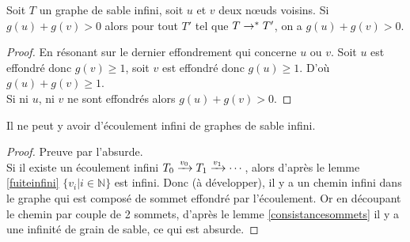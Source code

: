 \begin{lem}
\label{consistancesommets}
Soit $T$ un graphe de sable infini, soit $u$ et $v$ deux nœuds voisins. Si $g(u)+g(v)>0$ alors pour tout $T'$ tel que $T\rightarrow^* T'$, on a $g(u)+g(v)>0$.
\end{lem}
\begin{proof}
En résonant sur le dernier effondrement qui concerne $u$ ou $v$.
Soit $u$ est effondré donc $g(v)\geq 1$, soit $v$ est effondré donc $g(u) \geq 1$.
D'où $g(u) + g(v) \geq 1$.\\
Si ni $u$, ni $v$ ne sont effondrés alors $g(u) + g(v) > 0$.
\end{proof}

\begin{theo}
Il ne peut y avoir d'écoulement infini de graphes de sable infini.
\end{theo}

\begin{proof}
Preuve par l'absurde.\\
Si il existe un écoulement infini $T_0\xrightarrow{v_0}T_1\xrightarrow{v_1}\cdots$, alors d'après le lemme \ref{fuiteinfini} $\{v_i|i\in \mathbb{N}\}$ est infini. Donc (à développer), il y a un chemin infini dans le graphe qui est composé de sommet effondré par l'écoulement. Or en découpant le chemin par couple de 2 sommets, d'après le lemme \ref{consistancesommets} il y a une infinité de grain de sable, ce qui est absurde.
\end{proof}

